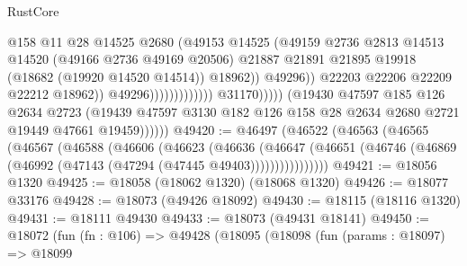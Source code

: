 \begin{lexlean}{RustCore}
\begin{coremodule}
                                                        @158
                                                        @11
                                                        @28
                                                        @14525
                                                        @2680
                                                        (@49153
                                                          @14525
                                                          (@49159
                                                            @2736
                                                            @2813
                                                            @14513
                                                            @14520
                                                            (@49166 @2736 @49169 @20506)
                                                            @21887
                                                            @21891
                                                            @21895
                                                            @19918
                                                            (@18682 (@19920 @14520 @14514))
                                                            @18962))
                                                        @49296))
                                                    @22203
                                                    @22206
                                                    @22209
                                                    @22212
                                                    @18962))
                                                @49296)))))))))))))
                      @31170)))))
            (@19430
              @47597
              @185
              @126
              @2634
              @2723
              (@19439 @47597 @3130 @182 @126 @158 @28 @2634 @2680 @2721 @19449 @47661 @19459))))))
@49420 := @46497
    (@46522
      (@46563
        (@46565
          (@46567
            (@46588
              (@46606
                (@46623
                  (@46636
                    (@46647
                      (@46651 (@46746 (@46869 (@46992 (@47143 (@47294 (@47445 @49403))))))))))))))))
@49421 := @18056 @1320
@49425 := @18058 (@18062 @1320) (@18068 @1320)
@49426 := @18077 @33176
@49428 := @18073 (@49426 @18092)
@49430 := @18115 (@18116 @1320)
@49431 := @18111 @49430
@49433 := @18073 (@49431 @18141)
@49450 := @18072
    (fun (fn : @106) =>
    @49428
      (@18095
        (@18098
          (fun (params : @18097) =>
          @18099

\end{coremodule}
\end{lexlean}

